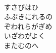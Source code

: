 \documentclass[10pt,b5j]{tarticle} %
\begin{document}
\begin{enumerate}
\begin{minipage}[c]{\blocksize}
    \end{minipage}
    \begin{minipage}[c]{\blocksize}
        
        \vspace{\linespace}
        \item~\\
        すさびはひ\\
        ふぶきにれるの\\
        ぞわれらがぎめ\\
        いざわがよく\\
        またむのへ
    
    \end{minipage}
\end{enumerate} %
\end{document}
